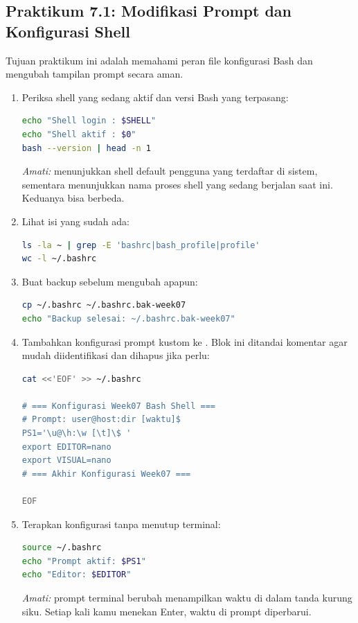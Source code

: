 \subsection*{Praktikum 7.1: Modifikasi Prompt dan Konfigurasi Shell}

Tujuan praktikum ini adalah memahami peran file konfigurasi Bash dan
mengubah tampilan prompt secara aman.

\begin{enumerate}
    \item Periksa shell yang sedang aktif dan versi Bash yang terpasang:
\begin{lstlisting}[language=bash, caption={Memeriksa shell aktif}]
echo "Shell login : $SHELL"
echo "Shell aktif : $0"
bash --version | head -n 1
\end{lstlisting}
    \textit{Amati:}  menunjukkan shell default pengguna yang
    terdaftar di sistem, sementara  menunjukkan nama proses shell
    yang sedang berjalan saat ini. Keduanya bisa berbeda.

    \item Lihat isi  yang sudah ada:
\begin{lstlisting}[language=bash, caption={Melihat konfigurasi .bashrc saat ini}]
ls -la ~ | grep -E 'bashrc|bash_profile|profile'
wc -l ~/.bashrc
\end{lstlisting}

    \item Buat backup  sebelum mengubah apapun:
\begin{lstlisting}[language=bash, caption={Membuat backup .bashrc}]
cp ~/.bashrc ~/.bashrc.bak-week07
echo "Backup selesai: ~/.bashrc.bak-week07"
\end{lstlisting}

    \item Tambahkan konfigurasi prompt kustom ke . Blok ini
          ditandai komentar agar mudah diidentifikasi dan dihapus jika perlu:
\begin{lstlisting}[language=bash, caption={Menambahkan konfigurasi prompt ke .bashrc}]
cat <<'EOF' >> ~/.bashrc

# === Konfigurasi Week07 Bash Shell ===
# Prompt: user@host:dir [waktu]$
PS1='\u@\h:\w [\t]\$ '
export EDITOR=nano
export VISUAL=nano
# === Akhir Konfigurasi Week07 ===

EOF
\end{lstlisting}

    \item Terapkan konfigurasi tanpa menutup terminal:
\begin{lstlisting}[language=bash, caption={Memuat ulang konfigurasi Bash}]
source ~/.bashrc
echo "Prompt aktif: $PS1"
echo "Editor: $EDITOR"
\end{lstlisting}
    \textit{Amati:} prompt terminal berubah menampilkan waktu di dalam
    tanda kurung siku. Setiap kali kamu menekan Enter, waktu di prompt
    diperbarui.


\end{enumerate}
